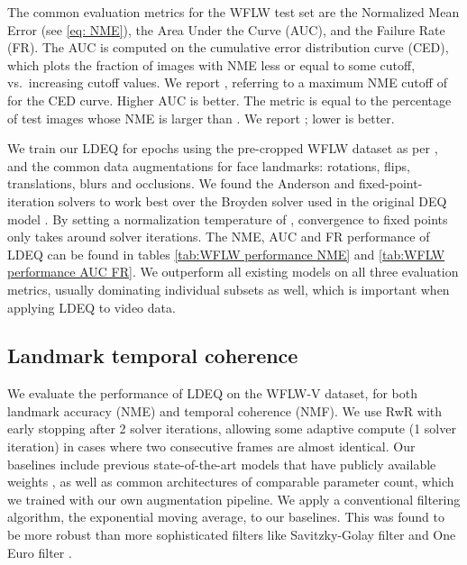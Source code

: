 \documentclass[10pt,twocolumn,letterpaper]{article}
\begin{document}
The common evaluation metrics for the WFLW test set are the Normalized Mean Error (see \cref{eq: NME}), the Area Under the Curve (AUC), and the Failure Rate (FR). The AUC is computed on the cumulative error distribution curve (CED), which plots the fraction of images with NME less or equal to some cutoff, vs.\ increasing cutoff values. We report , referring to a maximum NME cutoff of  for the CED curve. Higher AUC is better. The  metric is equal to the percentage of test images whose NME is larger than . We report ; lower is better.

We train our LDEQ for  epochs using the pre-cropped WFLW dataset as per \cite{Lan2021HIH}, and the common data augmentations for face landmarks: rotations, flips, translations, blurs and occlusions. We found the Anderson and fixed-point-iteration solvers to work best over the Broyden solver used in the original DEQ model \cite{Bai2019DEQs, Bai2020MDEQs}. By setting a normalization temperature of , convergence to fixed points only takes around  solver iterations. The NME, AUC and FR performance of LDEQ can be found in tables \ref{tab:WFLW performance NME} and \ref{tab:WFLW performance AUC FR}. We outperform all existing models on all three evaluation metrics, usually dominating individual subsets as well, which is important when applying LDEQ to video data.

\subsection{Landmark temporal coherence}
\label{subsec: exp-landmark coherence}
We evaluate the performance of LDEQ on the WFLW-V dataset, for both landmark accuracy (NME) and temporal coherence (NMF). We use RwR with early stopping after 2 solver iterations, allowing some adaptive compute (1 solver iteration) in cases where two consecutive frames are almost identical. Our baselines include previous state-of-the-art models that have publicly available weights \cite{Lan2021HIH, Xia2022SLPT, Lin2021StructureCoherent, Wang2019AdaptiveWingLoss}, as well as common architectures of comparable parameter count, which we trained with our own augmentation pipeline. We apply a conventional filtering algorithm, the exponential moving average, to our baselines. This was found to be more robust than more sophisticated filters like Savitzky-Golay filter \cite{SavitzkyGolay1964Filter} and One Euro filter \cite{Casiez2012OneEuroFilter}.
\end{document}
